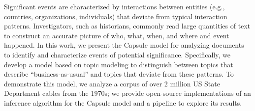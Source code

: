 
Significant events are characterized by interactions between entities (e.g., countries, organizations, individuals) that deviate from typical interaction patterns.  Investigators, such as historians, commonly read large quantities of text to construct an accurate picture of who, what, when, and where and event happened.  In this work, we present the Capsule model for analyzing documents to identify and characterize events of potential significance.
Specifically, we develop a model based on topic modeling to distinguish between topics that describe ``business-as-usual'' and topics that deviate from these patterns.
To demonstrate this model, we analyze a corpus of over 2 million US State Department cables from the 1970s; we provide open-source implementations of an inference algorithm for the Capsule model and a pipeline to explore its results.
